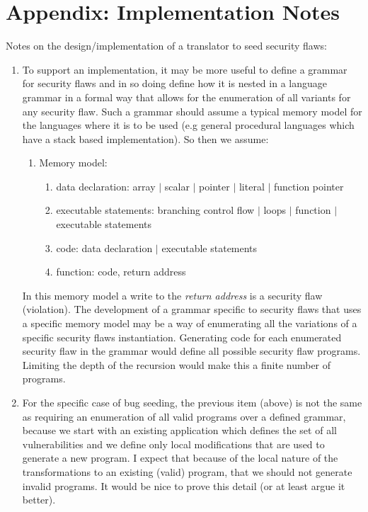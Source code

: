 \section*{Appendix: Implementation Notes}

Notes on the design/implementation of a translator to seed security flaws:
\begin{enumerate}

   \item To support an implementation, it may be more useful to define a grammar for
security flaws and in so doing define how it is nested in a language grammar in a formal
way that allows for the enumeration of all variants for any security flaw.
Such a grammar should assume a typical memory model for the languages
where it is to be used (e.g general procedural languages which have a
stack based implementation).  So then we assume:
      \begin{enumerate}
         \item Memory model:
            \begin{enumerate}
               \item data declaration: array $|$ scalar $|$ pointer $|$ literal $|$ function pointer
               \item executable statements: branching control flow $|$ loops $|$ function $|$ executable statements
               \item code: data declaration $|$ executable statements 
               \item function: code, return address
            \end{enumerate}
      \end{enumerate}
In this memory model a write to the {\em return address} is a security flaw (violation).
The development of a grammar specific to security flaws that uses a specific memory model
may be a way of enumerating all the variations of a specific security flaws instantiation.
Generating code for each enumerated security flaw in the grammar would define all possible
security flaw programs.  Limiting the depth of the recursion would make this a finite
number of programs.

   \item For the specific case of bug seeding, the previous item (above) is not the same
         as requiring an enumeration of all valid  programs over
         a defined grammar, because we start with an existing application which defines
         the set of all vulnerabilities and we define only local modifications that
         are used to generate a new program.  I expect that because of the local nature
         of the transformations to an existing (valid) program, that we should not
         generate invalid programs.  It would be nice to prove this detail (or 
         at least argue it better).


\end{enumerate}
